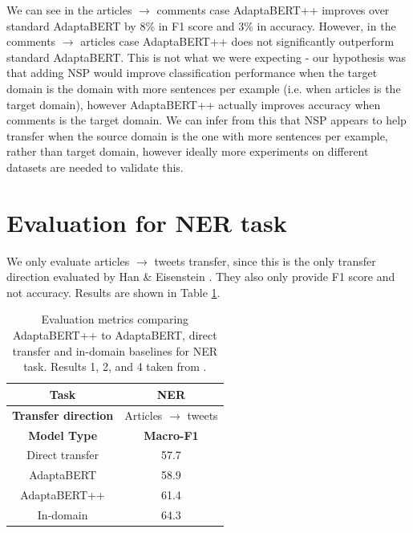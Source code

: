 We can see in the articles $ \rightarrow $ comments case AdaptaBERT++ improves over standard AdaptaBERT by 8\% in F1 score and 3\% in accuracy. However, in the comments $ \rightarrow $ articles case AdaptaBERT++ does not significantly outperform standard AdaptaBERT. This is not what we were expecting - our hypothesis was that adding NSP would improve classification performance when the target domain is the domain with more sentences per example (i.e. when articles is the target domain), however AdaptaBERT++ actually improves accuracy when comments is the target domain. We can infer from this that NSP appears to help transfer when the source domain is the one with more sentences per example, rather than target domain, however ideally more experiments on different datasets are needed to validate this.

\section{Evaluation for NER task}

We only evaluate articles $ \rightarrow $ tweets transfer, since this is the only transfer direction evaluated by Han \& Eisenstein \cite{adaptabert}. They also only provide F1 score and not accuracy. Results are shown in Table \ref{tab:adaptabert-nsp-ner-results}.

\begin{table}[ht]
    \begin{center}
        \begin{tabular}{|c|c|}
            \hline
            \textbf{Task} & NER \\
            \hline
            \textbf{Transfer direction} & Articles $ \rightarrow $ tweets \\
            \hline \hline
            \textbf{Model Type} & \textbf{Macro-F1} \\
            \hline
            Direct transfer & 57.7  \\
            AdaptaBERT & 58.9  \\
            AdaptaBERT++ & 61.4  \\
            \hline
            In-domain & 64.3 \\
            \hline
        \end{tabular}
    \end{center}
    \caption{Evaluation metrics comparing AdaptaBERT++ to AdaptaBERT, direct transfer and in-domain baselines for NER task. Results 1, 2, and 4 taken from \cite{adaptabert}.}
    \label{tab:adaptabert-nsp-ner-results}
\end{table}

